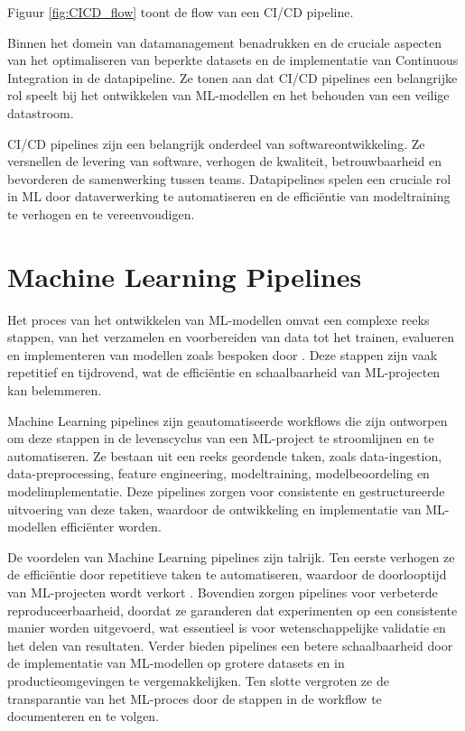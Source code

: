 Figuur \ref{fig:CICD_flow} toont de flow van een CI/CD pipeline.

Binnen het domein van datamanagement benadrukken \textcite{Samad2018} en \textcite{Vadavalasa2020} de cruciale aspecten van het optimaliseren van beperkte datasets en de implementatie van Continuous Integration in de datapipeline. Ze tonen aan dat CI/CD pipelines een belangrijke rol speelt bij het ontwikkelen van ML-modellen en het behouden van een veilige datastroom.

CI/CD pipelines zijn een belangrijk onderdeel van softwareontwikkeling. Ze versnellen de levering van software, verhogen de kwaliteit, betrouwbaarheid en bevorderen de samenwerking tussen teams. Datapipelines spelen een cruciale rol in ML door dataverwerking te automatiseren en de efficiëntie van modeltraining te verhogen en te vereenvoudigen.
\section{Machine Learning Pipelines}

Het proces van het ontwikkelen van ML-modellen omvat een complexe reeks stappen, van het verzamelen en voorbereiden van data tot het trainen, evalueren en implementeren van modellen zoals bespoken door \textcite{Vadavalasa2020}. Deze stappen zijn vaak repetitief en tijdrovend, wat de efficiëntie en schaalbaarheid van ML-projecten kan belemmeren.

Machine Learning pipelines zijn geautomatiseerde workflows die zijn ontworpen om deze stappen in de levenscyclus van een ML-project te stroomlijnen en te automatiseren. Ze bestaan uit een reeks geordende taken, zoals data-ingestion, data-preprocessing, feature engineering, modeltraining, modelbeoordeling en modelimplementatie. Deze pipelines zorgen voor consistente en gestructureerde uitvoering van deze taken, waardoor de ontwikkeling en implementatie van ML-modellen efficiënter worden.

De voordelen van Machine Learning pipelines zijn talrijk. Ten eerste verhogen ze de efficiëntie door repetitieve taken te automatiseren, waardoor de doorlooptijd van ML-projecten wordt verkort \textcite{Vadavalasa2020}. Bovendien zorgen pipelines voor verbeterde reproduceerbaarheid, doordat ze garanderen dat experimenten op een consistente manier worden uitgevoerd, wat essentieel is voor wetenschappelijke validatie en het delen van resultaten. Verder bieden pipelines een betere schaalbaarheid door de implementatie van ML-modellen op grotere datasets en in productieomgevingen te vergemakkelijken. Ten slotte vergroten ze de transparantie van het ML-proces door de stappen in de workflow te documenteren en te volgen.


